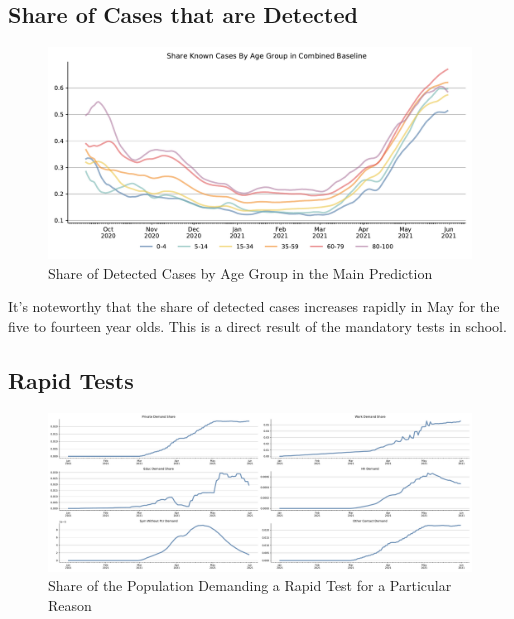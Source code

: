 \FloatBarrier


\subsection{Share of Cases that are Detected}
\label{subsec:appendix_share_known_cases}

\begin{figure}[ht]
  \centering
  \includegraphics[width=\textwidth]{../figures/results/figures/share_known_cases/full_combined_baseline_by_age_group_rki}
  \caption{Share of Detected Cases by Age Group in the Main Prediction}
  \label{fig:share_known_cases_by_age_group}
  \floatfoot{\noindent \textcolor{red}{\ldots}}
\end{figure}

It's noteworthy that the share of detected cases increases rapidly in May for the five to fourteen year olds. This is a direct result of the mandatory tests in school.

\subsection{Rapid Tests}
\label{subsec:appendix_rapid_tests}

\begin{figure}[ht]
  \centering
  \includegraphics[width=\textwidth]{../figures/results/figures/rapid_test_statistics/demand_shares}
  \caption{Share of the Population Demanding a Rapid Test for a Particular Reason}
  \label{fig:rapid_tests_by_reason}
\end{figure}

